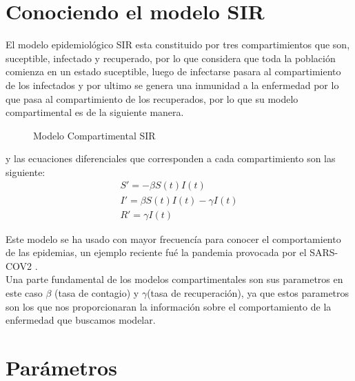 \section{Conociendo el modelo SIR}

El modelo epidemiológico SIR  esta constituido por tres compartimientos que son, suceptible, infectado y recuperado, por lo que considera que toda la población comienza en un estado suceptible, luego de infectarse pasara al compartimiento de los infectados y por ultimo se genera una inmunidad a la enfermedad por lo que pasa al compartimiento de los recuperados, por lo que su modelo compartimental es de la siguiente manera.\\


\begin{figure}[h]
\centering
{}
\caption{Modelo Compartimental SIR} \label{fig:Compartimento SIR}
\end{figure}	

y las ecuaciones diferenciales que corresponden a cada compartimiento son las siguiente: 
\begin{align}
S' = -\beta S\left(t\right)I\left(t\right)\\			
I' = \beta S\left(t\right)I\left(t\right) - \gamma I\left(t\right)\\		
R' = \gamma I\left(t\right)
\end{align}

Este modelo se ha usado con mayor frecuencía para conocer el comportamiento de las epidemias, un ejemplo reciente fué la pandemia provocada por el SARS-COV2 \cite{Martcheva}.\\

Una parte fundamental de los modelos compartimentales son sus parametros en este caso $\beta$ (tasa de contagio) y $\gamma$(tasa de recuperación), ya que estos parametros son los que nos proporcionaran la información sobre el comportamiento de la enfermedad que buscamos modelar.\\


\section{\textbf{Parámetros}}
